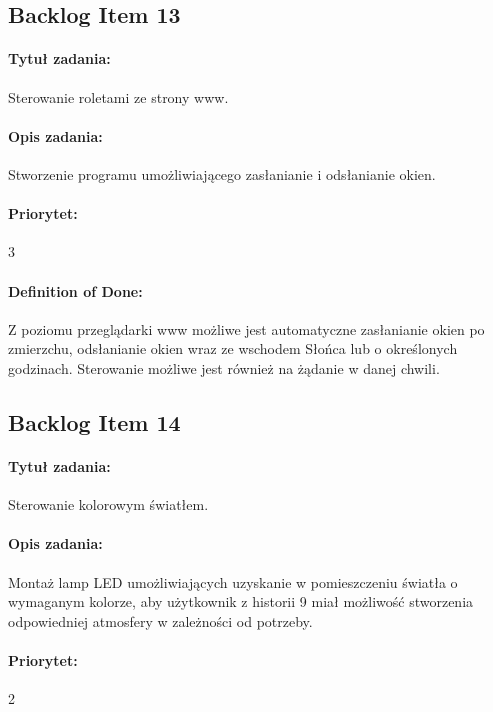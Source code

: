 
	\subsection{Backlog Item 13}
	\paragraph{Tytuł zadania:}
	Sterowanie roletami ze strony www.
	
	\paragraph{Opis zadania:} 
	Stworzenie programu umożliwiającego zasłanianie i odsłanianie okien.
	
	\paragraph{Priorytet:}
	3
	
	\paragraph{Definition of Done:}
	Z poziomu przeglądarki www możliwe jest automatyczne zasłanianie okien po zmierzchu, odsłanianie okien wraz ze wschodem Słońca lub o określonych godzinach. Sterowanie możliwe jest również na żądanie w danej chwili.


	
	\subsection{Backlog Item 14}
	\paragraph{Tytuł zadania:}
	Sterowanie kolorowym światłem.
	
	\paragraph{Opis zadania:}
	Montaż lamp LED umożliwiających uzyskanie w pomieszczeniu światła o wymaganym kolorze, aby użytkownik z historii 9 miał możliwość stworzenia odpowiedniej atmosfery w zależności od potrzeby.
	 
	\paragraph{Priorytet:}
	2
	
